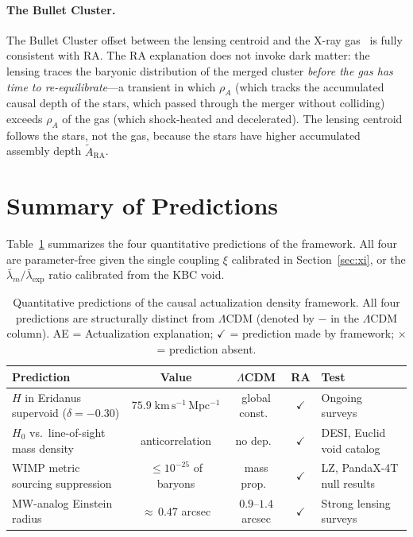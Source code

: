 \documentclass[11pt,twocolumn]{article}
\theoremstyle{plain}
\theoremstyle{remark}
\newcommand{\ARA}{\tilde{A}_{\mathrm{RA}}}
\newcommand{\lmb}{\bar{\lambda}_m}
\newcommand{\lexp}{\bar{\lambda}_{\mathrm{exp}}}
\begin{document}
\paragraph{The Bullet Cluster.}
The Bullet Cluster offset between the lensing centroid and the
X-ray gas~\cite{Clowe2006} is fully consistent with RA.
The RA explanation does not invoke dark matter: the lensing
traces the baryonic distribution of the merged cluster
\emph{before the gas has time to re-equilibrate}---a transient
in which $\rho_A$ (which tracks the accumulated causal depth of
the stars, which passed through the merger without colliding)
exceeds $\rho_A$ of the gas (which shock-heated and decelerated).
The lensing centroid follows the stars, not the gas, because the
stars have higher accumulated assembly depth $\ARA$.

\section{Summary of Predictions}
\label{sec:predictions}

Table~\ref{tab:predictions} summarizes the four quantitative
predictions of the framework.
All four are parameter-free given the single coupling $\xi$
calibrated in Section~\ref{sec:xi}, or the $\lmb/\lexp$ ratio
calibrated from the KBC void.

\begin{table}[t]
\centering
\caption{Quantitative predictions of the causal actualization density
  framework. All four predictions are structurally distinct from
  $\Lambda$CDM (denoted by $-$ in the $\Lambda$CDM column).
  AE = Actualization explanation; $\checkmark$ = prediction made
  by framework; $\times$ = prediction absent.}
\label{tab:predictions}
\small
\begin{tabular}{p{5.5cm}cccp{3.5cm}}
\toprule
Prediction & Value & $\Lambda$CDM & RA & Test \\
\midrule
$H$ in Eridanus supervoid ($\delta{=}{-}0.30$) &
  $75.9\;\mathrm{km\,s^{-1}\,Mpc^{-1}}$ & global const.\ & $\checkmark$ &
  Ongoing surveys~\cite{Naidoo2016} \\[3pt]
$H_0$ vs.\ line-of-sight mass density &
  anticorrelation & no dep.\ & $\checkmark$ &
  DESI, Euclid void catalog \\[3pt]
WIMP metric sourcing suppression &
  $\leq 10^{-25}$ of baryons & mass prop.\ & $\checkmark$ &
  LZ, PandaX-4T null results \\[3pt]
MW-analog Einstein radius &
  ${\approx}\,0.47$ arcsec & $0.9$--$1.4$ arcsec & $\checkmark$ &
  Strong lensing surveys \\
\bottomrule
\end{tabular}
\end{table}
\end{document}
